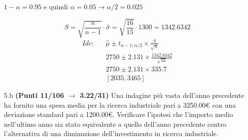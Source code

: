 \documentclass[
  11pt,
]{book}
\theoremstyle{mytheoremstyle}
\theoremstyle{mydefstyle}
\begin{document}
\(1-\alpha =0.95\) e quindi \(\alpha=0.05\rightarrow \alpha/2=0.025\)

\[
      S  =\sqrt{\frac {n}{n-1}}\cdot\hat\sigma =
     \sqrt{\frac { 16 }{ 15 }}\cdot 1300 = 1342.6342 
\]
\begin{eqnarray*}
  Idc: & &  \hat\mu \pm  t_{n-1;\alpha/2} \times \frac{S}{\sqrt{n}} \\
     & &  2750 \pm  2.131 \times \frac{ 1342.6342 }{\sqrt{ 16 }} \\
     & &  2750 \pm  2.131 \times  335.7 \\
     & & [ 2035 ,  3465 ]
\end{eqnarray*}

5.b \textbf{(Punti 11/106 \(\rightarrow\) 3.22/31)} Una indagine più vasta dell'anno precedente
ha fornito una spesa media per la ricerca industriale pari a
3250.00€ con una deviazione standard pari a 1200.00€.
Verificare l'ipotesi
che l'importo medio nell'ultimo anno sia stato equivalente a
quello dell'anno precedente contro l'alternativa di una
diminuzione dell'investimento in ricerca industriale.
\end{document}
